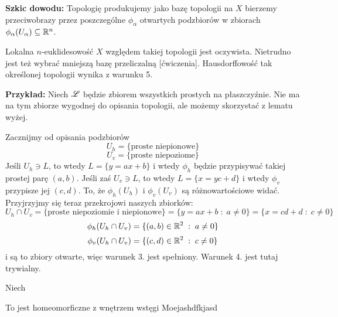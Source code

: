 \textbf{Szkic dowodu:} Topologię produkujemy jako bazę topologii na $X$ bierzemy przeciwobrazy przez poszczególne $\phi_\alpha$ otwartych podzbiorów w zbiorach $\phi_\alpha(U_\alpha)\subseteq\mathbb{R}^n$.

Lokalna $n$-euklidesowość $X$ względem takiej topologii jest oczywista. Nietrudno jest też wybrać mniejszą bazę przeliczalną [ćwiczenia]. Hausdorffowość tak określonej topologii wynika z warunku 5.

\textbf{Przykład:} Niech $\mathcal{L}$ będzie zbiorem wszystkich prostych na płaszczyźnie. Nie ma na tym zbiorze wygodnej do opisania topologii, ale możemy skorzystać z lematu wyżej.

Zacznijmy od opisania podzbiorów 
$$U_h=\{\text{proste niepionowe}\}$$
$$U_v=\{\text{proste niepoziome}\}$$
Jeśli $U_h\ni L$, to wtedy $L=\{y=ax+b\}$ i wtedy $\phi_h$ będzie przypisywać takiej prostej parę $(a, b)$. Jeśli zaś $U_v\ni L$, to wtedy $L=\{x=yc+d\}$ i wtedy $\phi_v$ przypisze jej $(c, d)$. To, że $\phi_h(U_h)$ i $\phi_v(U_v)$ są różnowartościowe widać. Przyjrzyjmy się teraz przekrojowi naszych zbiorków:
$$U_h\cap U_v=\{\text{proste niepoziomie i niepionowe}\}=\{y=ax+b\;:\;a\neq 0\}=\{x=cd+d\;:\;c\neq0\}$$
$$\phi_h(U_h\cap U_v)=\{(a,b)\in\mathbb{R}^2\;:\;a\neq 0\}$$
$$\phi_v(U_h\cap U_v)=\{(c,d)\in\mathbb{R}^2\;:\;c\neq0\}$$
i są to zbiory otwarte, więc warunek 3. jest spełniony. Warunek 4. jest tutaj trywialny.

Niech 

To jest homeomorficzne z wnętrzem wstęgi Moejashdfkjasd